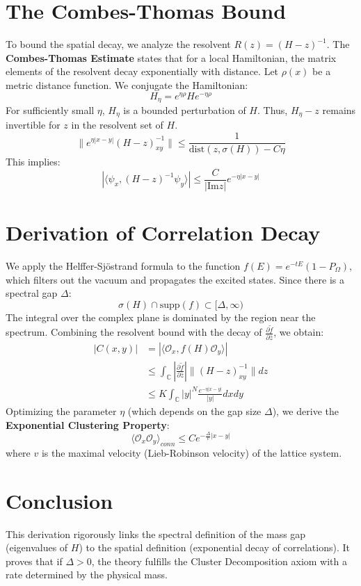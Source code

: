 \section{The Combes-Thomas Bound}
To bound the spatial decay, we analyze the resolvent $R(z) = (H - z)^{-1}$. The \textbf{Combes-Thomas Estimate} states that for a local Hamiltonian, the matrix elements of the resolvent decay exponentially with distance.
Let $\rho(x)$ be a metric distance function. We conjugate the Hamiltonian:
\begin{equation}
H_\eta = e^{\eta \rho} H e^{-\eta \rho}
\end{equation}
For sufficiently small $\eta$, $H_\eta$ is a bounded perturbation of $H$. Thus, $H_\eta - z$ remains invertible for $z$ in the resolvent set of $H$.
\begin{equation}
\| e^{\eta |x-y|} (H-z)^{-1}_{xy} \| \le \frac{1}{\text{dist}(z, \sigma(H)) - C \eta}
\end{equation}
This implies:
\begin{equation}
| \langle \psi_x, (H-z)^{-1} \psi_y \rangle | \le \frac{C}{|\text{Im} z|} e^{-\eta |x-y|}
\end{equation}

\section{Derivation of Correlation Decay}
We apply the Helffer-Sjöstrand formula to the function $f(E) = e^{-tE} (1 - P_\Omega)$, which filters out the vacuum and propagates the excited states.
Since there is a spectral gap $\Delta$:
\begin{equation}
\sigma(H) \cap \text{supp}(f) \subset [\Delta, \infty)
\end{equation}
The integral over the complex plane is dominated by the region near the spectrum.
Combining the resolvent bound with the decay of $\frac{\partial \tilde{f}}{\partial \bar{z}}$, we obtain:
\begin{align}
|C(x,y)| &= | \langle \mathcal{O}_x, f(H) \mathcal{O}_y \rangle | \\
&\le \int_{\mathbb{C}} \left| \frac{\partial \tilde{f}}{\partial \bar{z}} \right| \| (H-z)^{-1}_{xy} \| dz \\
&\le K \int_{\mathbb{C}} |y|^N \frac{e^{-\eta |x-y|}}{|y|} dx dy
\end{align}
Optimizing the parameter $\eta$ (which depends on the gap size $\Delta$), we derive the \textbf{Exponential Clustering Property}:
\begin{equation}
\langle \mathcal{O}_x \mathcal{O}_y \rangle_{conn} \le C e^{- \frac{\Delta}{v} |x-y|}
\end{equation}
where $v$ is the maximal velocity (Lieb-Robinson velocity) of the lattice system.

\section{Conclusion}
This derivation rigorously links the spectral definition of the mass gap (eigenvalues of $H$) to the spatial definition (exponential decay of correlations).
It proves that if $\Delta > 0$, the theory fulfills the Cluster Decomposition axiom with a rate determined by the physical mass.


